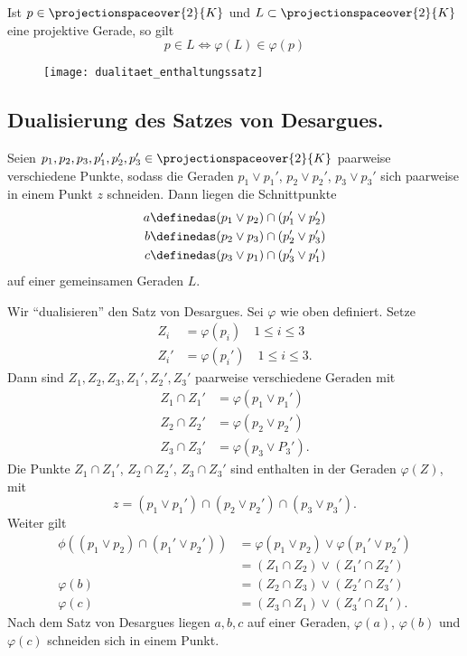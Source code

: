 Ist \( p\in \projectionspaceover{2}{K} \) und \( L\subset \projectionspaceover{2}{K} \) eine projektive Gerade, so gilt
\begin{equation*}
  p\in L\iff \varphi(L)\in \varphi(p)
\end{equation*}
\begin{figure}[H]
  \centering
  \texttt{[image: dualitaet\_enthaltungssatz]}
  \label{fig:dualitaet_enthaltungssatz}
\end{figure}
\subsection*{Dualisierung des Satzes von Desargues.}
\begin{erinnerung*}
  Seien \( p_1,p_2,p_3,p_1',p_2',p_3'\in \projectionspaceover{2}{K} \) paarweise verschiedene Punkte, sodass die Geraden \( p_1\vee p_1' \), \( p_2\vee p_2' \), \( p_3\vee p_3' \) sich paarweise in einem Punkt \( z \) schneiden. Dann liegen die Schnittpunkte
  \begin{align*}
    a&\definedas (p_1\vee p_2)\cap (p_1'\vee p_2')\\
    b&\definedas (p_2\vee p_3)\cap (p_2'\vee p_3')\\
    c&\definedas (p_3\vee p_1)\cap (p_3'\vee p_1')
  \end{align*}
  auf einer gemeinsamen Geraden \( L \). 
\end{erinnerung*}
Wir \enquote{dualisieren} den Satz von Desargues. Sei \( \varphi \) wie oben definiert. Setze
\begin{align*}
  Z_i&=\varphi(p_i)\quad 1\leq i\leq 3\\
  Z_i'&=\varphi(p_i')\quad 1\leq i\leq 3.
\end{align*}
Dann sind \( Z_1,Z_2,Z_3,Z_1',Z_2',Z_3' \) paarweise verschiedene Geraden mit
\begin{align*}
  Z_1\cap Z_1'&=\varphi(p_1\vee p_1')\\
  Z_2\cap Z_2'&=\varphi(p_2\vee p_2')\\
  Z_3\cap Z_3'&=\varphi(p_3\vee P_3').
\end{align*}
Die Punkte \( Z_1\cap Z_1' \), \( Z_2\cap Z_2' \), \( Z_3\cap Z_3' \) sind enthalten in der Geraden \( \varphi(Z) \), mit
\begin{equation*}
  z=(p_1\vee p_1')\cap (p_2\vee p_2')\cap (p_3\vee p_3').
\end{equation*}
Weiter gilt
\begin{align*}
  \phi((p_1\vee p_2)\cap (p_1'\vee p_2'))&=\varphi(p_1\vee p_2)\vee \varphi(p_1'\vee p_2')\\
  &=(Z_1\cap Z_2)\vee (Z_1'\cap Z_2')\\
  \varphi(b)&=(Z_2\cap Z_3)\vee (Z_2'\cap Z_3')\\
  \varphi(c)&=(Z_3\cap Z_1)\vee (Z_3'\cap Z_1').
\end{align*}
Nach dem Satz von Desargues liegen \( a,b,c \) auf einer Geraden, \dh \( \varphi(a) \), \( \varphi(b) \) und \( \varphi(c) \) schneiden sich in einem Punkt.

